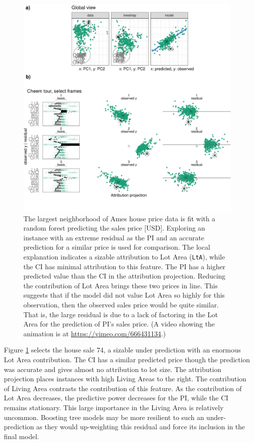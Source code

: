\documentclass[11pt,twoside]{article}
\begin{document}
\begin{figure}

{\centering \includegraphics[width=0.9\linewidth]{./figures/case_ames2018} 

}

\caption{The largest neighborhood of Ames house price data is fit with a random forest predicting the sales price {[}USD{]}. Exploring an instance with an extreme residual as the PI and an accurate prediction for a similar price is used for comparison. The local explanation indicates a sizable attribution to Lot Area (\texttt{LtA}), while the CI has minimal attribution to this feature. The PI has a higher predicted value than the CI in the attribution projection. Reducing the contribution of Lot Area brings these two prices in line. This suggests that if the model did not value Lot Area so highly for this observation, then the observed sales price would be quite similar. That is, the large residual is due to a lack of factoring in the Lot Area for the prediction of PI's sales price. (A video showing the animation is at \url{https://vimeo.com/666431134}.)}\label{fig:caseames}
\end{figure}

Figure \ref{fig:caseames} selects the house sale 74, a sizable under prediction with an enormous Lot Area contribution. The CI has a similar predicted price though the prediction was accurate and gives almost no attribution to lot size. The attribution projection places instances with high Living Areas to the right. The contribution of Living Area contrasts the contribution of this feature. As the contribution of Lot Area decreases, the predictive power decreases for the PI, while the CI remains stationary. This large importance in the Living Area is relatively uncommon. Boosting tree models may be more resilient to such an under-prediction as they would up-weighting this residual and force its inclusion in the final model.
\end{document}
